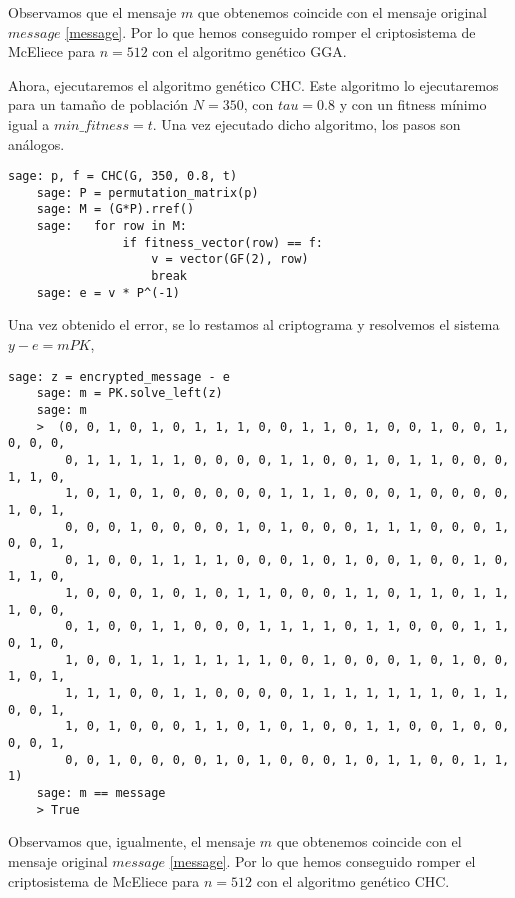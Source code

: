 \begin{exampleth}
    Observamos que el mensaje $m$ que obtenemos coincide con el mensaje original $message$ \eqref{message}. Por lo que hemos conseguido romper el criptosistema de McEliece para $n = 512$ con el algoritmo genético GGA.

    Ahora, ejecutaremos el algoritmo genético CHC. Este algoritmo lo ejecutaremos para un tamaño de población $N = 350$, con $tau = 0.8$ y con un fitness mínimo igual a $min\_fitness = t$. Una vez ejecutado dicho algoritmo, los pasos son análogos.

    \begin{lstlisting}[gobble=4]
    sage: p, f = CHC(G, 350, 0.8, t)
    sage: P = permutation_matrix(p)
    sage: M = (G*P).rref()
    sage:   for row in M:
                if fitness_vector(row) == f:
                    v = vector(GF(2), row)
                    break
    sage: e = v * P^(-1)
    \end{lstlisting}

    Una vez obtenido el error, se lo restamos al criptograma y resolvemos el sistema $y - e = mPK$,

    \begin{lstlisting}[gobble=4]
    sage: z = encrypted_message - e
    sage: m = PK.solve_left(z)
    sage: m
    >  (0, 0, 1, 0, 1, 0, 1, 1, 1, 0, 0, 1, 1, 0, 1, 0, 0, 1, 0, 0, 1, 0, 0, 0, 
        0, 1, 1, 1, 1, 1, 0, 0, 0, 0, 1, 1, 0, 0, 1, 0, 1, 1, 0, 0, 0, 1, 1, 0, 
        1, 0, 1, 0, 1, 0, 0, 0, 0, 0, 1, 1, 1, 0, 0, 0, 1, 0, 0, 0, 0, 1, 0, 1, 
        0, 0, 0, 1, 0, 0, 0, 0, 1, 0, 1, 0, 0, 0, 1, 1, 1, 0, 0, 0, 1, 0, 0, 1, 
        0, 1, 0, 0, 1, 1, 1, 1, 0, 0, 0, 1, 0, 1, 0, 0, 1, 0, 0, 1, 0, 1, 1, 0, 
        1, 0, 0, 0, 1, 0, 1, 0, 1, 1, 0, 0, 0, 1, 1, 0, 1, 1, 0, 1, 1, 1, 0, 0, 
        0, 1, 0, 0, 1, 1, 0, 0, 0, 1, 1, 1, 1, 0, 1, 1, 0, 0, 0, 1, 1, 0, 1, 0, 
        1, 0, 0, 1, 1, 1, 1, 1, 1, 1, 0, 0, 1, 0, 0, 0, 1, 0, 1, 0, 0, 1, 0, 1, 
        1, 1, 1, 0, 0, 1, 1, 0, 0, 0, 0, 1, 1, 1, 1, 1, 1, 1, 0, 1, 1, 0, 0, 1, 
        1, 0, 1, 0, 0, 0, 1, 1, 0, 1, 0, 1, 0, 0, 1, 1, 0, 0, 1, 0, 0, 0, 0, 1, 
        0, 0, 1, 0, 0, 0, 0, 1, 0, 1, 0, 0, 0, 1, 0, 1, 1, 0, 0, 1, 1, 1)
    sage: m == message
    > True
    \end{lstlisting}

    Observamos que, igualmente, el mensaje $m$ que obtenemos coincide con el mensaje original $message$ \eqref{message}. Por lo que hemos conseguido romper el criptosistema de McEliece para $n = 512$ con el algoritmo genético CHC.
\end{exampleth}